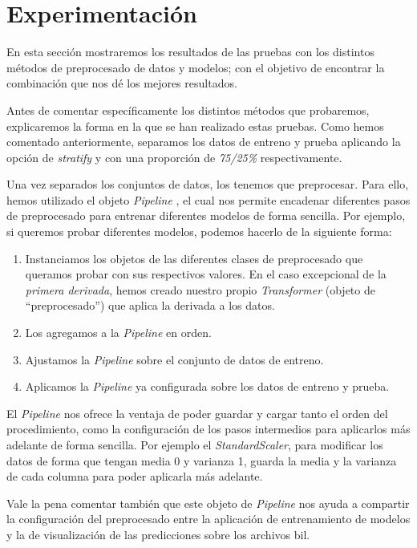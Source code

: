\section{Experimentación}\label{sec:experimentacion}

En esta sección mostraremos los resultados de las pruebas con los distintos métodos de preprocesado de datos y modelos; con el objetivo de encontrar la combinación que nos dé los mejores resultados.

Antes de comentar específicamente los distintos métodos que probaremos, explicaremos la forma en la que se han realizado estas pruebas.
Como hemos comentado anteriormente, separamos los datos de entreno y prueba aplicando la opción de \textit{stratify} y con una proporción de \textit{75/25\%} respectivamente.

Una vez separados los conjuntos de datos, los tenemos que preprocesar. Para ello, hemos utilizado el objeto \textit{Pipeline} \cite{sklearnp32:online}, el cual nos permite encadenar diferentes pasos de preprocesado para entrenar diferentes modelos de forma sencilla. Por ejemplo, si queremos probar diferentes modelos, podemos hacerlo de la siguiente forma: 

\begin{enumerate}
    \item Instanciamos los objetos de las diferentes clases de preprocesado que queramos probar con sus respectivos valores. En el caso excepcional de la \textit{primera derivada}, hemos creado nuestro propio \textit{Transformer} (objeto de ``preprocesado'') que aplica la derivada a los datos.
    \item Los agregamos a la \textit{Pipeline} en orden.
    \item Ajustamos la \textit{Pipeline} sobre el conjunto de datos de entreno.
    \item Aplicamos la \textit{Pipeline} ya configurada sobre los datos de entreno y prueba. 
\end{enumerate}


El \textit{Pipeline} nos ofrece la ventaja de poder guardar y cargar tanto el orden del procedimiento, como la configuración de los pasos intermedios para aplicarlos más adelante de forma sencilla. Por ejemplo el \textit{StandardScaler}, para modificar los datos de forma que tengan media 0 y varianza 1, guarda la media y la varianza de cada columna para poder aplicarla más adelante.

Vale la pena comentar también que este objeto de \textit{Pipeline} nos ayuda a compartir la configuración del preprocesado entre la aplicación de entrenamiento de modelos y la de visualización de las predicciones sobre los archivos \gls{bil}.


